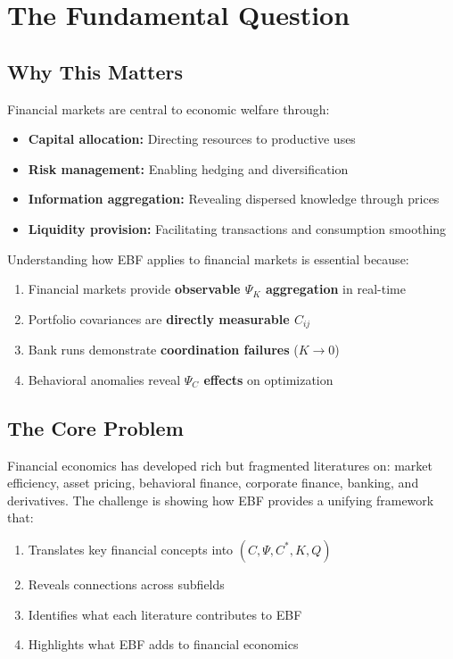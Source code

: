 \section{The Fundamental Question}
\label{sec:Y-fundamental}

\subsection{Why This Matters}

Financial markets are central to economic welfare through:
\begin{itemize}
    \item \textbf{Capital allocation:} Directing resources to productive uses
    \item \textbf{Risk management:} Enabling hedging and diversification
    \item \textbf{Information aggregation:} Revealing dispersed knowledge through prices
    \item \textbf{Liquidity provision:} Facilitating transactions and consumption smoothing
\end{itemize}

Understanding how EBF applies to financial markets is essential because:
\begin{enumerate}
    \item Financial markets provide \textbf{observable $\Psi_K$ aggregation} in real-time
    \item Portfolio covariances are \textbf{directly measurable $C_{ij}$}
    \item Bank runs demonstrate \textbf{coordination failures} ($K \to 0$)
    \item Behavioral anomalies reveal \textbf{$\Psi_C$ effects} on optimization
\end{enumerate}

\subsection{The Core Problem}

Financial economics has developed rich but fragmented literatures on:
market efficiency, asset pricing, behavioral finance, corporate finance,
banking, and derivatives. The challenge is showing how EBF provides a
unifying framework that:
\begin{enumerate}
    \item Translates key financial concepts into $(C, \Psi, C^*, K, Q)$
    \item Reveals connections across subfields
    \item Identifies what each literature contributes to EBF
    \item Highlights what EBF adds to financial economics
\end{enumerate}

